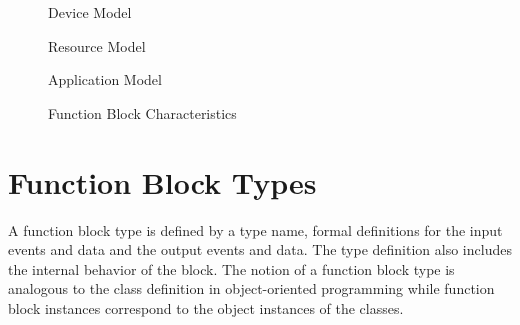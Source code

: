 %
\begin{figure}
\begin{center}
 \caption[Device
Model]{Device Model{\protect ~\cite{IEC-61499}}}
\label{f:Device_Model}
\end{center}
\end{figure}
%

%
\begin{figure}
\begin{center}
 \caption[Resource
Model]{Resource Model{\protect ~\cite{IEC-61499}}}
\label{f:Resource_Model}
\end{center}
\end{figure}
%

%
\begin{figure}
\begin{center}
\caption[Application Model]{Application Model{\protect
~\cite{IEC-61499}}} \label{f:Application_Model}
\end{center}
\end{figure}
%

%
\begin{figure}
\begin{center}
\caption[Function Block Characteristics]{Function Block
Characteristics{\protect ~\cite{IEC-61499}}}
\label{f:Function_Block_Char}
\end{center}
\end{figure}
%

\section{Function Block Types}

A function block type is defined by a type name, formal
definitions for the input events and data and the output events
and data. The type definition also includes the internal behavior
of the block. The notion of a function block type is analogous to
the class definition in object-oriented programming while function
block instances correspond to the object instances of the classes.

